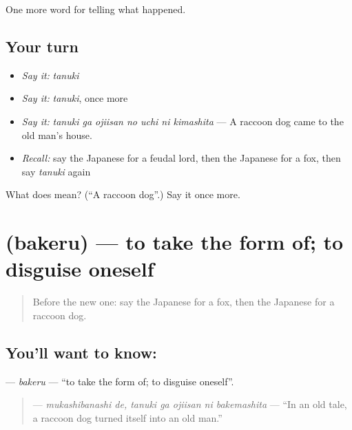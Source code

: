 \begin{grammarlens}[title={What you've built}]
One more word for telling what happened.
\end{grammarlens}

\subsection*{Your turn}
\begin{itemize}
\raggedright
  \item \emph{Say it:} \emph{tanuki}
  \item \emph{Say it:} \emph{tanuki}, once more
  \item \emph{Say it:} \emph{tanuki ga ojiisan no uchi ni kimashita} — A raccoon dog came to the old man's house.
  \item \emph{Recall:} say the Japanese for a feudal lord, then the Japanese for a fox, then say \emph{tanuki} again
\end{itemize}

\begin{tcolorbox}[breakable,colback=teal!4,colframe=teal!35!black,title={Before you move on}]
What does  mean? (\textquotedblleft{}A raccoon dog\textquotedblright{}.) Say it once more.
\end{tcolorbox}
\section[\texorpdfstring{\ja{ばける} (bakeru)}{ばける (bakeru)}]{ (bakeru) — to take the form of; to disguise oneself}

\label{lesson:JA-C300-bakeru}



\begin{quote}
Before the new one: say the Japanese for a fox, then the Japanese for a raccoon dog.
\end{quote}

\subsection*{You'll want to know: }
\textbf{} — \emph{bakeru} — \textquotedblleft{}to take the form of; to disguise oneself\textquotedblright{}.

\begin{quote}
\textbf{  } — \emph{mukashibanashi de, tanuki ga ojiisan ni bakemashita} — \textquotedblleft{}In an old tale, a raccoon dog turned itself into an old man.\textquotedblright{}
\end{quote}

